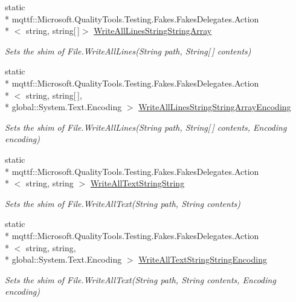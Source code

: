 \begin{DoxyCompactItemize}
static \\*
mqttf\-::\-Microsoft.\-Quality\-Tools.\-Testing.\-Fakes.\-Fakes\-Delegates.\-Action\\*
$<$ string, string\mbox{[}$\,$\mbox{]}$>$ \hyperlink{class_system_1_1_i_o_1_1_fakes_1_1_shim_file_af467c6e511f6f8a9be1a62ddb7cbcbd3}{Write\-All\-Lines\-String\-String\-Array}
\begin{DoxyCompactList}\small\item\em Sets the shim of File.\-Write\-All\-Lines(\-String path, String\mbox{[}$\,$\mbox{]} contents)\end{DoxyCompactList}\item 
static \\*
mqttf\-::\-Microsoft.\-Quality\-Tools.\-Testing.\-Fakes.\-Fakes\-Delegates.\-Action\\*
$<$ string, string\mbox{[}$\,$\mbox{]}, \\*
global\-::\-System.\-Text.\-Encoding $>$ \hyperlink{class_system_1_1_i_o_1_1_fakes_1_1_shim_file_acc2385ada7d14e34be69f3a4e3f1d00b}{Write\-All\-Lines\-String\-String\-Array\-Encoding}
\begin{DoxyCompactList}\small\item\em Sets the shim of File.\-Write\-All\-Lines(\-String path, String\mbox{[}$\,$\mbox{]} contents, Encoding encoding)\end{DoxyCompactList}\item 
static \\*
mqttf\-::\-Microsoft.\-Quality\-Tools.\-Testing.\-Fakes.\-Fakes\-Delegates.\-Action\\*
$<$ string, string $>$ \hyperlink{class_system_1_1_i_o_1_1_fakes_1_1_shim_file_ad89748fcb7497e04db01cc766bafabe6}{Write\-All\-Text\-String\-String}
\begin{DoxyCompactList}\small\item\em Sets the shim of File.\-Write\-All\-Text(\-String path, String contents)\end{DoxyCompactList}\item 
static \\*
mqttf\-::\-Microsoft.\-Quality\-Tools.\-Testing.\-Fakes.\-Fakes\-Delegates.\-Action\\*
$<$ string, string, \\*
global\-::\-System.\-Text.\-Encoding $>$ \hyperlink{class_system_1_1_i_o_1_1_fakes_1_1_shim_file_a0ec7529b9b6e5c37e5081c9fa6e7e217}{Write\-All\-Text\-String\-String\-Encoding}
\begin{DoxyCompactList}\small\item\em Sets the shim of File.\-Write\-All\-Text(\-String path, String contents, Encoding encoding)\end{DoxyCompactList}\end{DoxyCompactItemize}


